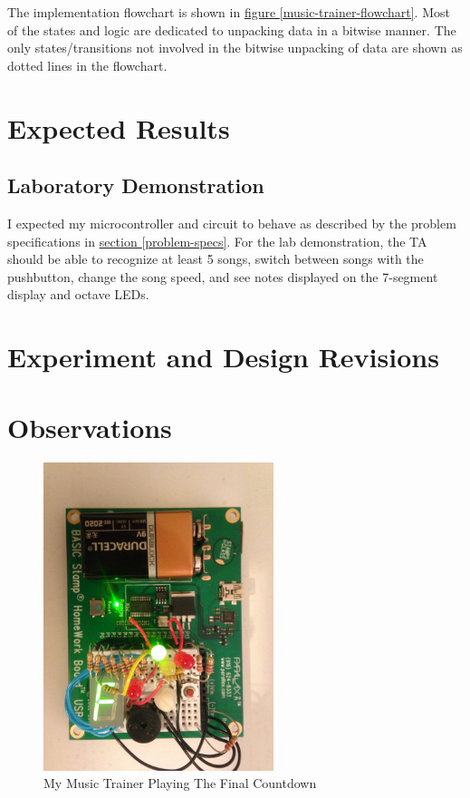 \documentclass[11pt]{article}
\begin{document}
The implementation flowchart is shown in
\hyperref[music-trainer-flowchart]{figure \ref{music-trainer-flowchart}}.
Most of the states and logic are dedicated to unpacking data in a bitwise
manner. The only states/transitions not involved in the bitwise unpacking
of data are shown as dotted lines in the flowchart.

\section{Expected Results}

\subsection{Laboratory Demonstration}

I expected my microcontroller and circuit to behave as described by the problem specifications in
\hyperref[problem-specs]{section \ref{problem-specs}}.
For the lab demonstration, the TA should be able to recognize at least 5 songs,
switch between songs with the pushbutton, change the song speed, and
see notes displayed on the 7-segment display and octave LEDs.

\section{Experiment and Design Revisions}

\section{Observations}

\begin{figure}[h!]
\centering
\includegraphics[width=0.6\textwidth]{the-music-trainer.jpg}
\caption{My Music Trainer Playing The Final Countdown}
\label{the-music-trainer}
\end{figure}
\end{document}
